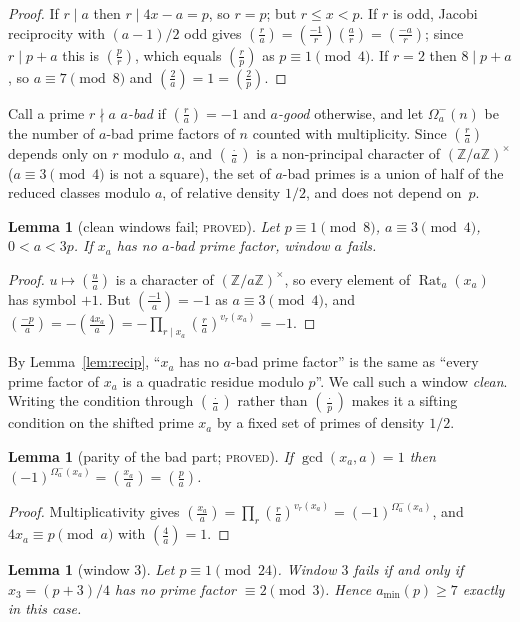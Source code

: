 \documentclass[11pt,reqno]{amsart}
\newtheorem{lemma}[theorem]{Lemma}
\theoremstyle{definition}
\newcommand{\Z}{\mathbb Z}
\newcommand{\Rat}{\operatorname{Rat}}
\newcommand{\amin}{a_{\min}}
\newcommand{\leg}[2]{\left(\frac{#1}{#2}\right)}
\newcommand{\status}[1]{\textup{\textsc{#1}}}
\begin{document}
\begin{proof}
If $r\mid a$ then $r\mid4x-a=p$, so $r=p$; but $r\le x<p$.  If $r$ is odd,
Jacobi reciprocity with $(a-1)/2$ odd gives
$\leg ra=\leg{-1}r\leg ar=\leg{-a}r$; since $r\mid p+a$ this is $\leg pr$,
which equals $\leg rp$ as $p\equiv1\pmod4$.  If $r=2$ then $8\mid p+a$, so
$a\equiv7\pmod8$ and $\leg2a=1=\leg2p$.
\end{proof}

Call a prime $r\nmid a$ \emph{$a$-bad} if $\leg ra=-1$ and \emph{$a$-good}
otherwise, and let $\Omega_a^-(n)$ be the number of $a$-bad prime factors
of $n$ counted with multiplicity.  Since $\leg ra$ depends only on $r$
modulo $a$, and $\leg\cdot a$ is a non-principal character of
$(\Z/a\Z)^\times$ ($a\equiv3\pmod4$ is not a square), the set of $a$-bad
primes is a union of half of the reduced classes modulo $a$, of relative
density $1/2$, and does not depend on~$p$.

\begin{lemma}[clean windows fail; \status{proved}]\label{lem:F1}
Let $p\equiv1\pmod 8$, $a\equiv3\pmod4$, $0<a<3p$.  If $x_a$ has no
$a$-bad prime factor, window $a$ fails.
\end{lemma}

\begin{proof}
$u\mapsto\leg ua$ is a character of $(\Z/a\Z)^\times$, so every element of
$\Rat_a(x_a)$ has symbol $+1$.  But $\leg{-1}a=-1$ as $a\equiv3\pmod4$, and
$\leg{-p}a=-\leg{4x_a}a=-\prod_{r\mid x_a}\leg ra^{v_r(x_a)}=-1$.
\end{proof}

By Lemma~\ref{lem:recip}, ``$x_a$ has no $a$-bad prime factor'' is the same as
``every prime factor of $x_a$ is a quadratic residue modulo $p$''.  We call
such a window \emph{clean}.  Writing the condition through $\leg\cdot a$
rather than $\leg\cdot p$ makes it a sifting condition on the shifted prime
$x_a$ by a fixed set of primes of density $1/2$.

\begin{lemma}[parity of the bad part; \status{proved}]\label{lem:parity}
If $\gcd(x_a,a)=1$ then $(-1)^{\Omega_a^-(x_a)}=\leg{x_a}a=\leg pa$.
\end{lemma}

\begin{proof}
Multiplicativity gives $\leg{x_a}a=\prod_r\leg ra^{v_r(x_a)}=(-1)^{\Omega_a^-(x_a)}$,
and $4x_a\equiv p\pmod a$ with $\leg4a=1$.
\end{proof}

\begin{lemma}[window 3]\label{lem:w3}
Let $p\equiv1\pmod{24}$.  Window $3$ fails if and only if $x_3=(p+3)/4$ has
no prime factor $\equiv2\pmod3$.  Hence $\amin(p)\ge7$ exactly in this case.
\end{lemma}
\end{document}
